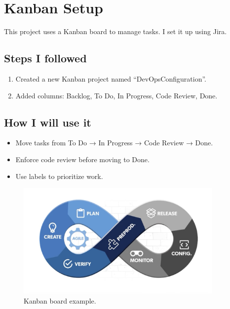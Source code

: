 \chapter{Kanban Setup}

This project uses a Kanban board to manage tasks. I set it up using Jira. 

\section*{Steps I followed}
\begin{enumerate}
  \item Created a new Kanban project named ``DevOpsConfiguration''.
  \item Added columns: Backlog, To Do, In Progress, Code Review, Done.
\end{enumerate}

\section*{How I will use it}
\begin{itemize}
  \item Move tasks from To Do → In Progress → Code Review → Done.
  \item Enforce code review before moving to Done.
  \item Use labels to prioritize work.
\end{itemize}

\begin{figure}[h]
\centering
\includegraphics[width=0.9\textwidth]{png/stvagileProcess.png}
\caption{Kanban board example.}
\end{figure}

